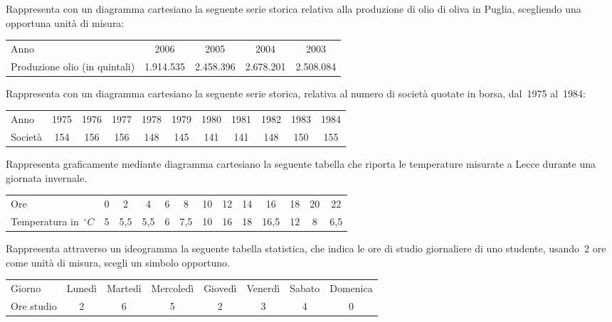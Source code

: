 \begin{esercizio}
\label{ese:A.10}
Rappresenta con un diagramma cartesiano la seguente serie storica relativa 
alla produzione di olio di oliva in Puglia,
scegliendo una opportuna unità di misura:
\begin{center}
 \begin{tabularx}{.9\textwidth}{Xcccc}
\toprule
Anno & 2006 & 2005 & 2004 & 2003\\
Produzione olio (in quintali)& 1.914.535 & 2.458.396 & 2.678.201 & 
2.508.084\\
\bottomrule
\end{tabularx}
\end{center}
\end{esercizio}

\begin{esercizio}
\label{ese:A.11}
Rappresenta con un diagramma cartesiano la seguente serie storica, relativa 
al numero di società quotate in borsa, dal~1975 al~1984:
\begin{center}
 \begin{tabular}{lcccccccccc}
\toprule
Anno & 1975 & 1976 & 1977 & 1978 & 1979 & 1980 & 1981 & 1982 & 1983 & 1984 
\\
Società & 154 & 156 & 156 & 148 & 145 & 141 & 141 & 148 & 150 & 155 \\
\bottomrule
\end{tabular}
\end{center}
\end{esercizio}

\begin{esercizio}
\label{ese:A.12}
Rappresenta graficamente mediante diagramma cartesiano la seguente tabella 
che riporta le temperature misurate a Lecce durante una giornata invernale.
\begin{center}
\begin{tabularx}{.9\textwidth}{X*{12}{c}}
\toprule
Ore & 0 & 2 & 4 & 6 & 8  & 10 & 12 & 14 & 16 & 18 & 20 & 22\\
Temperatura in~$\unit{^\circ C}$ & 5 & 5,5  & 5,5 & 6 & 7,5 & 10 & 16 & 18 
& 16,5 & 12 & 8 & 6,5\\
\bottomrule
\end{tabularx}
\end{center}
\end{esercizio}

\begin{esercizio}
\label{ese:A.13}
Rappresenta attraverso un ideogramma la seguente tabella statistica, che 
indica le ore di studio giornaliere di uno studente,
usando~2 ore come unità di misura, scegli un simbolo opportuno.
\begin{center}
\begin{tabular}{l*{7}{c}}
\toprule
Giorno & Lunedì & Martedì & Mercoledì & Giovedì & Venerdì & Sabato & 
Domenica \\
Ore studio & 2 & 6 & 5 & 2 & 3 & 4 & 0 \\
\bottomrule
\end{tabular}
\end{center}
\end{esercizio}

